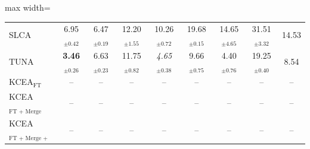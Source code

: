 \begin{table}[!t]
\begin{adjustbox}{max width=\textwidth}
\begin{tabular}{l c c c c c c c c}
SLCA & 6.95$_{\pm 0.42}$ & 6.47$_{\pm 0.19}$ & 12.20$_{\pm 1.55}$ & 10.26$_{\pm 0.72}$ & 19.68$_{\pm 0.15}$ & 14.65$_{\pm 4.65}$ & 31.51$_{\pm 3.32}$ & 14.53 \\
TUNA & \textbf{3.46}$_{\pm 0.26}$ & 6.63$_{\pm 0.23}$ & 11.75$_{\pm 0.82}$ & \textit{4.65}$_{\pm 0.38}$ & 9.66$_{\pm 0.75}$ & 4.40$_{\pm 0.76}$ & 19.25$_{\pm 0.40}$ & 8.54 \\
\midrule
KCEA$_{\text{FT}}$ & -- & -- & -- & -- & -- & -- & -- & -- \\
KCEA$_{\text{FT + Merge}}$ & -- & -- & -- & -- & -- & -- & -- & -- \\
KCEA$_{\text{FT + Merge + Align}}$ & -- & -- & -- & -- & -- & -- & -- & -- \\
\bottomrule
\end{tabular}
\end{adjustbox}
\end{table}